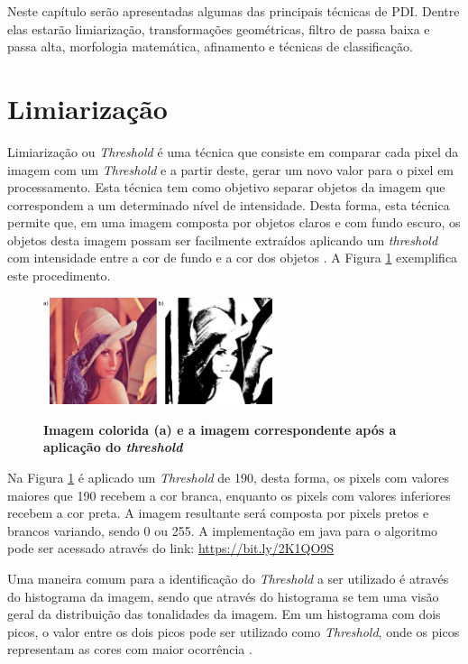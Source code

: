 \documentclass[
	12pt,				%
	oneside,			%
	a4paper,			%
	english,			%
	french,				%
	spanish,			%
	brazil,				%
	]{abntex2}
\begin{document}
Neste capítulo serão apresentadas algumas das principais técnicas de PDI. Dentre elas estarão limiarização, transformações geométricas, filtro de passa baixa e passa alta, morfologia matemática, afinamento e técnicas de classificação.
\section{Limiarização}
\label{sec:limiarizacao}

Limiarização ou \textit{Threshold} é uma técnica que consiste em comparar cada pixel da imagem com um \textit{Threshold} e a partir deste, gerar um novo valor para o pixel em processamento. Esta técnica tem como objetivo separar objetos da imagem que correspondem a um determinado nível de intensidade. Desta forma, esta técnica permite que, em uma imagem composta por objetos claros e com fundo escuro, os objetos desta imagem possam ser facilmente extraídos aplicando um \textit{threshold} com intensidade entre a cor de fundo e a cor dos objetos \cite{gonzalesWoods:2008}. A Figura \ref{fig:limiarizacaofig} exemplifica este procedimento.

\begin{figure}[ht]
\centering

\caption{\textbf{Imagem colorida (a) e a imagem correspondente após a aplicação do \textit{threshold}}}
\includegraphics[width=0.6\textwidth]{imagens/limiarizacao.png}
\sourceAuthor
\label{fig:limiarizacaofig}
\end{figure}

Na Figura \ref{fig:limiarizacaofig} é aplicado um \textit{Threshold} de 190, desta forma, os pixels com valores maiores que 190 recebem a cor branca, enquanto os pixels com valores inferiores recebem a cor preta. A imagem resultante será composta por pixels pretos e brancos variando, sendo 0 ou 255. A implementação em java para o algoritmo pode ser acessado através do link: \url{https://bit.ly/2K1QO9S}

Uma maneira comum para a identificação do \textit{Threshold} a ser utilizado é através do histograma da imagem, sendo que através do histograma se tem uma visão geral da distribuição das tonalidades da imagem. Em um histograma com dois picos, o valor entre os dois picos pode ser utilizado como \textit{Threshold}, onde os picos representam as cores com maior ocorrência \cite{gonzalesWoods:2008}. 
\end{document}
